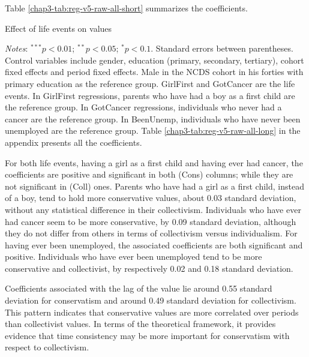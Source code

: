 Table \ref{chap3-tab:reg-v5-raw-all-short} summarizes the coefficients.
\begin{table}[!tb]
    \centering
    \caption{Effect of life events on values}
    \label{chap3-tab:reg-v5-raw-all-short}
    \begin{threeparttable}
        \setlength{\tabcolsep}{0pt}
        
        \begin{tablenotes}[flushleft]
            \footnotesize{\item \textit{Notes}: $^{***}p<0.01$; $^{**}p<0.05$; $^{*}p<0.1$. Standard errors between parentheses. Control variables include gender, education (primary, secondary, tertiary), cohort fixed effects and period fixed effects. Male in the NCDS cohort in his forties with primary education as the reference group. GirlFirst and GotCancer are the life events. In GirlFirst regressions, parents who have had a boy as a first child are the reference group. In GotCancer regressions, individuals who never had a cancer are the reference group. In BeenUnemp, individuals who have never been unemployed are the reference group. Table \ref{chap3-tab:reg-v5-raw-all-long} in the appendix presents all the coefficients.}
        \end{tablenotes}
    \end{threeparttable}
\end{table}
For both life events, having a girl as a first child and having ever had cancer, the coefficients are positive and significant in both (Cons) columns; while they are not significant in (Coll) ones.
Parents who have had a girl as a first child, instead of a boy, tend to hold more conservative values, about 0.03 standard deviation, without any statistical difference in their collectivism.
Individuals who have ever had cancer seem to be more conservative, by 0.09 standard deviation, although they do not differ from others in terms of collectivism versus individualism.
For having ever been unemployed, the associated coefficients are both significant and positive.
Individuals who have ever been unemployed tend to be more conservative and collectivist, by respectively 0.02 and 0.18 standard deviation.

Coefficients associated with the lag of the value lie around 0.55 standard deviation for conservatism and around 0.49 standard deviation for collectivism. This pattern indicates that conservative values are more correlated over periods than collectivist values. In terms of the theoretical framework, it provides evidence that time consistency may be more important for conservatism with respect to collectivism.

